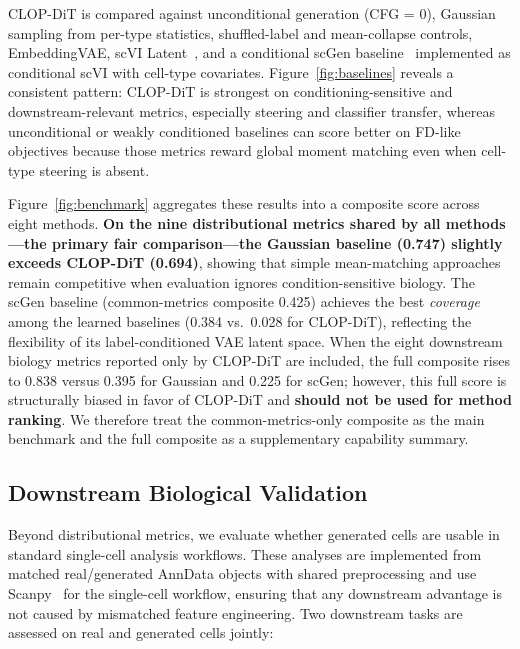 \documentclass[11pt,a4paper]{article}
\begin{document}
CLOP-DiT is compared against unconditional generation (CFG = 0), Gaussian sampling from per-type statistics, shuffled-label and mean-collapse controls, EmbeddingVAE, scVI Latent~\cite{ref-scvi}, and a conditional scGen baseline~\cite{ref-scgen} implemented as conditional scVI with cell-type covariates. Figure~\ref{fig:baselines} reveals a consistent pattern: CLOP-DiT is strongest on conditioning-sensitive and downstream-relevant metrics, especially steering and classifier transfer, whereas unconditional or weakly conditioned baselines can score better on FD-like objectives because those metrics reward global moment matching even when cell-type steering is absent.

Figure~\ref{fig:benchmark} aggregates these results into a composite score across eight methods. \textbf{On the nine distributional metrics shared by all methods---the primary fair comparison---the Gaussian baseline (0.747) slightly exceeds CLOP-DiT (0.694)}, showing that simple mean-matching approaches remain competitive when evaluation ignores condition-sensitive biology. The scGen baseline (common-metrics composite 0.425) achieves the best \emph{coverage} among the learned baselines (0.384 vs.\ 0.028 for CLOP-DiT), reflecting the flexibility of its label-conditioned VAE latent space. When the eight downstream biology metrics reported only by CLOP-DiT are included, the full composite rises to 0.838 versus 0.395 for Gaussian and 0.225 for scGen; however, this full score is structurally biased in favor of CLOP-DiT and \textbf{should not be used for method ranking}. We therefore treat the common-metrics-only composite as the main benchmark and the full composite as a supplementary capability summary.

\subsection{Downstream Biological Validation}

Beyond distributional metrics, we evaluate whether generated cells are usable in standard single-cell analysis workflows. These analyses are implemented from matched real/generated AnnData objects with shared preprocessing and use Scanpy~\cite{ref-scanpy} for the single-cell workflow, ensuring that any downstream advantage is not caused by mismatched feature engineering. Two downstream tasks are assessed on real and generated cells jointly:
\end{document}
